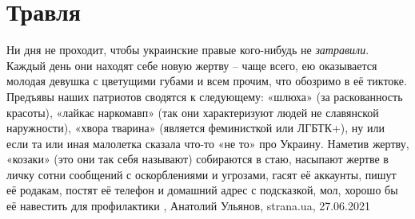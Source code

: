  
 
 
 
 
\chapter{Травля}
\label{sec:slova.travlja}

Ни дня не проходит, чтобы украинские правые кого-нибудь не \emph{затравили}. Каждый
день они находят себе новую жертву – чаще всего, ею оказывается молодая девушка
с цветущими губами и всем прочим, что обозримо в её тиктоке.  Предъявы наших
патриотов сводятся к следующему: «шлюха» (за раскованность красоты), «лайкає
наркомавп» (так они характеризуют людей не славянской наружности), «хвора
тварина» (является феминисткой или ЛГБТК+), ну или если та или иная малолетка
сказала что-то «не то» про Украину.  Наметив жертву, «козаки» (это они так себя
называют) собираются в стаю, насыпают жертве в личку сотни сообщений с
оскорблениями и угрозами, гасят её аккаунты, пишут её родакам, постят её
телефон и домашний адрес с подсказкой, мол, хорошо бы её навестить для
профилактики
, 
Анатолий Ульянов, strana.ua, 27.06.2021

